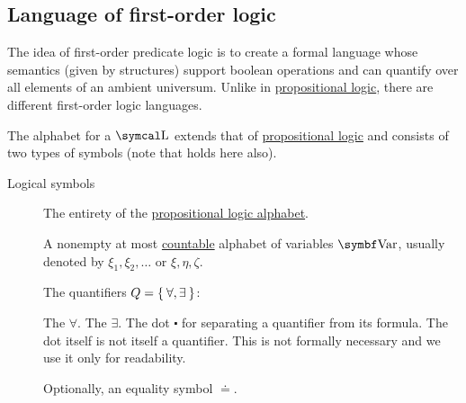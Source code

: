 \subsection{Language of first-order logic}\label{subsec:language_of_first_order_logic}

\begin{definition}\label{def:first_order_language}
  The idea of first-order predicate logic is to create a formal language whose semantics (given by structures) support boolean operations and can quantify over all elements of an ambient universum. Unlike in \hyperref[subsec:language_of_propositional_logic]{propositional logic}, there are different first-order logic languages.

  The alphabet for a  \( \CL \) extends that of \hyperref[subsec:language_of_propositional_logic]{propositional logic} and consists of two types of symbols (note that  holds here also).

  \begin{description}
    \item[Logical symbols]\mbox{}
    \begin{DefEnum}[series=def:first_order_language]
       The entirety of the \hyperref[subsec:language_of_propositional_logic]{propositional logic alphabet}.

       A nonempty at most \hyperref[rem:cardinals/countable]{countable} alphabet of variables \( \Bold{Var} \), usually denoted by \( \xi_1, \xi_2, \ldots \) or \( \xi, \eta, \zeta \).

       The quantifiers \( Q = \Set{ \forall, \exists } \):
      \begin{DefEnum}
         The  \( \forall \).
         The  \( \exists \).
         The dot \( \centerdot \) for separating a quantifier from its formula. The dot itself is not itself a quantifier. This is not formally necessary and we use it only for readability.
      \end{DefEnum}

       Optionally, an equality symbol \( \doteq \).
    \end{DefEnum}


\end{description}
\end{definition}
